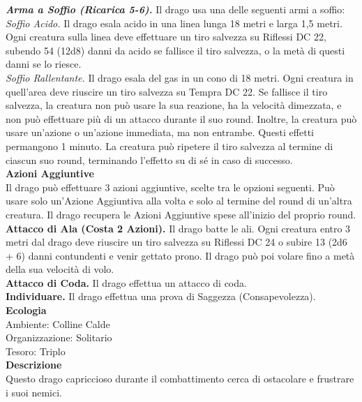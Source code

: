 \begin{multicols}{2}
\emph{\textbf{Arma a Soffio (Ricarica 5-6).}} Il drago usa una delle seguenti armi a soffio:\\
\emph{Soffio Acido.} Il drago esala acido in una linea lunga 18 metri e larga 1,5 metri. Ogni creatura sulla linea deve effettuare un tiro salvezza su Riflessi DC  22, subendo 54 (12d8) danni da acido se fallisce il tiro salvezza, o la metà di questi danni se lo riesce.\\
\emph{Soffio Rallentante.} Il drago esala del gas in un cono di 18 metri. Ogni creatura in quell'area deve riuscire un tiro salvezza su Tempra DC  22. Se fallisce il tiro salvezza, la creatura non può usare la sua reazione, ha la velocità dimezzata, e non può effettuare più di un attacco durante il suo round. Inoltre, la creatura può usare un'azione o un'azione immediata, ma non entrambe. Questi effetti permangono 1 minuto. La creatura può ripetere il tiro salvezza al termine di ciascun suo round, terminando l'effetto su di sé in caso di successo.\\
\textbf{Azioni Aggiuntive}\\
Il drago può effettuare 3 azioni aggiuntive, scelte tra le opzioni seguenti. Può usare solo un'Azione Aggiuntiva alla volta e solo al termine del round di un'altra creatura. Il drago recupera le Azioni Aggiuntive spese all'inizio del proprio round.\\
\textbf{Attacco di Ala (Costa 2 Azioni).} Il drago batte le ali. Ogni creatura entro 3 metri dal drago deve riuscire un tiro salvezza su Riflessi DC  24 o subire 13 (2d6 + 6) danni contundenti e venir gettato prono. Il drago può poi volare fino a metà della sua velocità di volo.\\
\textbf{Attacco di Coda.} Il drago effettua un attacco di coda.\\
\textbf{Individuare.} Il drago effettua una prova di Saggezza (Consapevolezza).\\
\textbf{Ecologia}\\
Ambiente: Colline Calde\\
Organizzazione: Solitario\\
Tesoro: Triplo\\
\textbf{Descrizione}\\
Questo drago capriccioso durante il combattimento cerca di ostacolare e frustrare i suoi nemici.\\



\end{multicols}
